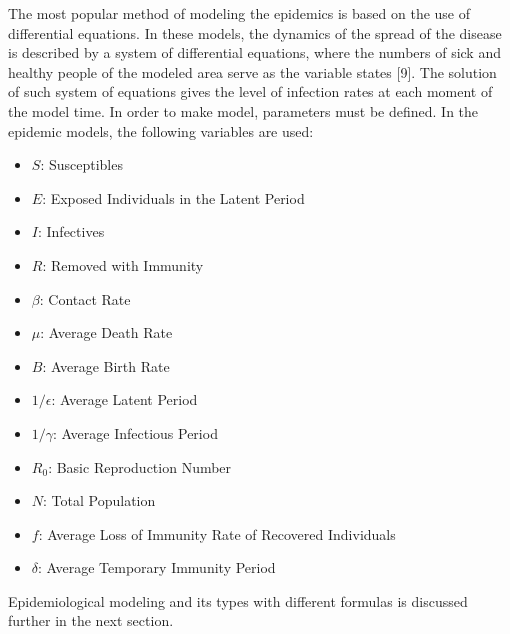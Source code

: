 The most popular method of modeling the epidemics is based on the use of differential equations. In these models, the dynamics of the spread of the disease is described by a system of differential equations, where the numbers of sick and healthy people of the modeled area serve as the variable states [9]. The solution of such system of equations gives the level of infection rates at each moment of the model time. In order to make model, parameters must be defined. In the epidemic models, the following variables are used:

\begin{itemize}
\item $S$: Susceptibles
\item $E$: Exposed Individuals in the Latent Period
\item $I$: Infectives
\item $R$: Removed with Immunity
\item $\beta$: Contact Rate
\item $\mu$: Average Death Rate
\item $B$: Average Birth Rate
\item $1/\epsilon$: Average Latent Period
\item $1/\gamma$: Average Infectious Period
\item $R_0$: Basic Reproduction Number
\item $N$: Total Population
\item $f$: Average Loss of Immunity Rate of Recovered Individuals
\item $\delta$: Average Temporary Immunity Period
\end{itemize}

Epidemiological modeling and its types with different formulas is discussed further in the next section.
